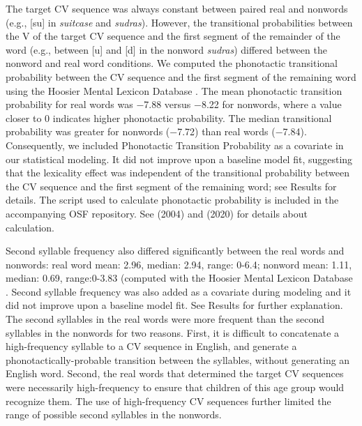 \documentclass[a4paper,man,natbib,donotrepeattitle, apacite]{apa6}
\begin{document}
The target CV sequence was always constant between paired real and nonwords (e.g., [su] in \textit{suitcase} and \textit{sudras}). However, the transitional probabilities between the V of the target CV sequence and the first segment of the remainder of the word (e.g., between [u] and [d] in the nonword \textit{sudras}) differed between the nonword and real word conditions. We computed the phonotactic transitional probability between the CV sequence and the first segment of the remaining word using the Hoosier Mental Lexicon Database \cite{pisoniSpeechPerceptionWord1985}. The mean phonotactic transition probability for real words was −7.88 versus −8.22 for nonwords, where a value closer to 0 indicates higher phonotactic probability. The median transitional probability was greater for nonwords (−7.72) than real words (−7.84). Consequently, we included Phonotactic Transition Probability as a covariate in our statistical modeling. It did not improve upon a baseline model fit, suggesting that the lexicality effect was independent of the transitional probability between the CV sequence and the first segment of the remaining word; see Results for details. The script used to calculate phonotactic probability is included in the accompanying OSF repository. See \citeauthor{edwardsInteractionVocabularySize2004} (2004) and \citeauthor{cychoszLexicalAdvantageFouryearold2020} (2020) for details about calculation. 

Second syllable frequency also differed significantly between the real words and nonwords: real word mean: 2.96, median: 2.94, range: 0-6.4; nonword mean: 1.11, median: 0.69, range:0-3.83 (computed with the Hoosier Mental Lexicon Database \cite{pisoniSpeechPerceptionWord1985}. Second syllable frequency was also added as a covariate during modeling and it did not improve upon a baseline model fit. See Results for further explanation. The second syllables in the real words were more frequent than the second syllables in the nonwords for two reasons. First, it is difficult to concatenate a high-frequency syllable to a CV sequence in English, and generate a phonotactically-probable transition between the syllables, without generating an English word. Second, the real words that determined the target CV sequences were necessarily high-frequency to ensure that children of this age group would recognize them. The use of high-frequency CV sequences further limited the range of possible second syllables in the nonwords. 
\end{document}
